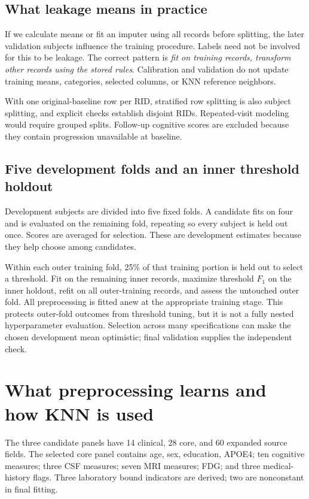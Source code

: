 \subsection{What leakage means in practice}
If we calculate means or fit an imputer using all records before splitting, the later validation subjects influence the training procedure. Labels need not be involved for this to be leakage. The correct pattern is \emph{fit on training records, transform other records using the stored rules}. Calibration and validation do not update training means, categories, selected columns, or KNN reference neighbors.

With one original-baseline row per RID, stratified row splitting is also subject splitting, and explicit checks establish disjoint RIDs. Repeated-visit modeling would require grouped splits. Follow-up cognitive scores are excluded because they contain progression unavailable at baseline.

\subsection{Five development folds and an inner threshold holdout}
Development subjects are divided into five fixed folds. A candidate fits on four and is evaluated on the remaining fold, repeating so every subject is held out once. Scores are averaged for selection. These are development estimates because they help choose among candidates.

Within each outer training fold, 25\% of that training portion is held out to select a threshold. Fit on the remaining inner records, maximize threshold $F_1$ on the inner holdout, refit on all outer-training records, and assess the untouched outer fold. All preprocessing is fitted anew at the appropriate training stage. This protects outer-fold outcomes from threshold tuning, but it is not a fully nested hyperparameter evaluation. Selection across many specifications can make the chosen development mean optimistic; final validation supplies the independent check.
\clearpage

\section{What preprocessing learns and how KNN is used}
The three candidate panels have 14 clinical, 28 core, and 60 expanded source fields. The selected core panel contains age, sex, education, APOE4; ten cognitive measures; three CSF measures; seven MRI measures; FDG; and three medical-history flags. Three laboratory bound indicators are derived; two are nonconstant in final fitting.

